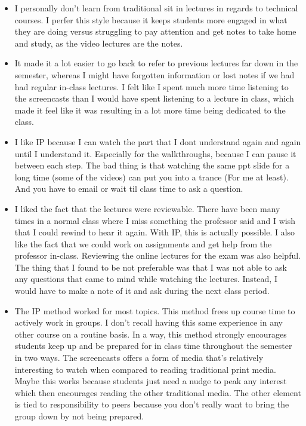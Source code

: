 \documentclass[11pt]{article}
\begin{document}
\begin{itemize}

\item  	I personally don't learn from traditional sit in lectures in
  regards to technical courses. I perfer this style because it keeps
  students more engaged in what they are doing versus struggling to pay
  attention and get notes to take home and study, as the video lectures are
  the notes.

\item It made it a lot easier to go back to refer to previous lectures far
  down in the semester, whereas I might have forgotten information or lost
  notes if we had had regular in-class lectures. I felt like I spent much
  more time listening to the screencasts than I would have spent listening
  to a lecture in class, which made it feel like it was resulting in a lot
  more time being dedicated to the class.

\item I like IP because I can watch the part that I dont understand again
  and again until I understand it. Especially for the walkthroughs, because
  I can pause it between each step. The bad thing is that watching the same
  ppt slide for a long time (some of the videos) can put you into a trance
  (For me at least). And you have to email or wait til class time to ask a
  question.

\item I liked the fact that the lectures were reviewable.  There have been
  many times in a normal class where I miss something the professor said
  and I wish that I could rewind to hear it again.  With IP, this is
  actually possible.  I also like the fact that we could work on
  assignments and get help from the professor in-class.  Reviewing the
  online lectures for the exam was also helpful.   	The thing that I
  found to be not preferable was that I was not able to ask any questions
  that came to mind while watching the lectures.  Instead, I would have to
  make a note of it and ask during the next class period.

\item The IP method worked for most topics. This method frees up course
  time to actively work in groups. I don't recall having this same
  experience in any other course on a routine basis. In a way, this method
  strongly encourages students keep up and be prepared for in class time
  throughout the semester in two ways. The screencasts offers a form of
  media that's relatively interesting to watch when compared to reading
  traditional print media. Maybe this works because students just need a
  nudge to peak any interest which then encourages reading the other
  traditional media. The other element is tied to responsibility to peers
  because you don't really want to bring the group down by not being
  prepared.


\end{itemize}
\end{document}
